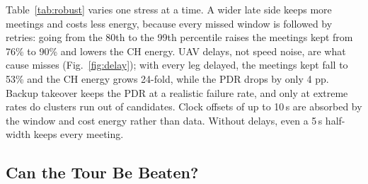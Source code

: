 \documentclass[conference]{IEEEtran}
\begin{document}
Table~\ref{tab:robust} varies one stress at a time. A wider late side keeps more meetings and
costs less energy, because every missed window is followed by retries: going from the 80th to
the 99th percentile raises the meetings kept from 76\% to 90\% and lowers the CH energy. UAV
delays, not speed noise, are what cause misses (Fig.~\ref{fig:delay}); with every leg delayed, the meetings kept fall to
53\% and the CH energy grows 24-fold, while the PDR drops by only 4 pp. Backup takeover keeps the
PDR at a realistic failure rate, and only at extreme rates do clusters run out of candidates.
Clock offsets of up to 10\,s are absorbed by the window and cost energy rather than data. Without
delays, even a 5\,s half-width keeps every meeting.

\subsection{Can the Tour Be Beaten?}\label{sec:beat}

\begin{table}[t]
\caption{Two cases built to favour leaving the tour (ten unseen 100-sensor networks; burst loss:
share of the data generated during bursts that is lost to full buffers).}\label{tab:bursts}
\centering\small
\setlength{\tabcolsep}{3pt}
\end{table}
\end{document}

